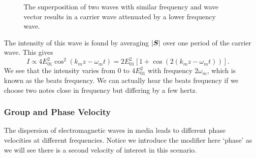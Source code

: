     \begin{figure}[htp]
        \centering
        \caption{The superposition of two waves with similar frequency and wave vector results in a carrier wave attenuated by a lower frequency wave.}
        \label{fig:carrier and modulating wave}
    \end{figure}
    The intensity of this wave is found by averaging \(\abs{\bm{S}}\) over one period of the carrier wave.
    This gives
    \[I \propto 4E_{01}^2\cos^2(k_mz - \omega_mt) = 2E_{01}^2[1 + \cos(2(k_mz - \omega_mt))].\]
    We see that the intensity varies from 0 to \(4E_{01}^2\) with frequency \(2\omega_{m}\), which is known as the beats frequency.
    We can actually hear the beats frequency if we choose two notes close in frequency but differing by a few hertz.
    
    \subsubsection{Group and Phase Velocity}
    The dispersion of electromagnetic waves in media leads to different phase velocities at different frequencies.
    Notice we introduce the modifier here `phase' as we will see there is a second velocity of interest in this scenario.
    
